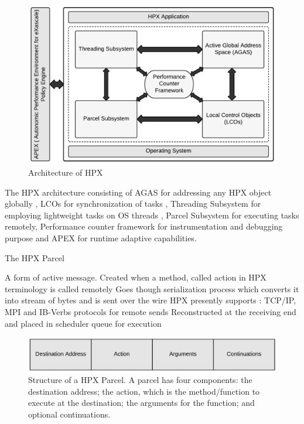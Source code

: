 \documentclass[10pt]{beamer}
\begin{document}
\begin{frame}
\begin{figure}
	\centering
	\includegraphics[width=0.72\linewidth]{figures/hpx_arch.pdf}
	\caption{Architecture of HPX}
\end{figure}
The HPX architecture consisting of \alert{AGAS} for addressing any HPX object globally , \alert{LCOs} for synchronization of tasks , \alert{Threading Subsystem} for employing lightweight tasks on OS threads , \alert{Parcel Subsystem for executing tasks remotely}, \alert{Performance counter} framework for instrumentation and debugging purpose and \alert{APEX} for runtime adaptive capabilities. 

\end{frame}

\begin{frame}{The HPX Parcel}
\begin{outline}
	\1 A form of \alert{active message.}
	\1 Created when a method, called \alert{action} in HPX terminology is called remotely 
	\1 Goes though serialization process which converts it into stream of bytes and is sent over the wire
	\1 HPX presently supports : TCP/IP, MPI and IB-Verbs protocols for remote sends
	\1 Reconstructed at the receiving end and placed in scheduler queue for execution
\end{outline}
\begin{figure}
\centering
\includegraphics[width=1\linewidth]{figures/hpx_parcel.pdf}
\caption{Structure of a HPX Parcel. A parcel has four components: the destination address; the action, which is the method/function to execute at the destination; the arguments for the function; and optional continuations. }
\end{figure}
\end{frame}
\end{document}
